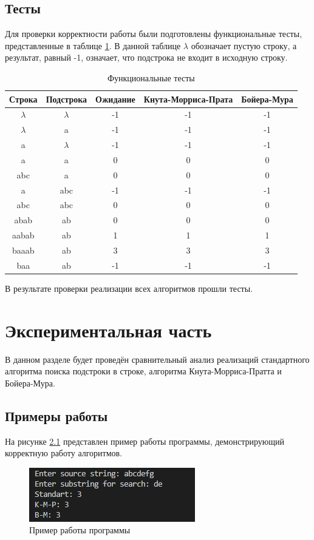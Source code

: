 \documentclass[12pt, a4paper]{report}
\begin{document}
	\section{Тесты}
	Для проверки корректности работы были подготовлены функциональные тесты, представленные в таблице \ref{unit-tests}. В данной таблице $\lambda$ обозначает пустую строку, а результат, равный -1, означает, что подстрока не входит в исходную строку.
	
	\begin{table}[ht!]
		\caption{Функциональные тесты}
		\label{unit-tests}
		\begin{center}
			\begin{tabular}{|c|c||c||c|c|}
			\hline
			\bf{Строка} & \bf{Подстрока} & \bf{Ожидание} & \bf{Кнута-Морриса-Прата} & \bf{Бойера-Мура}\\\hline
			$\lambda$ & $\lambda$ & -1 & -1 & -1 \\\hline
			$\lambda$ & a & -1 & -1 & -1 \\\hline
			a & $\lambda$ & -1 & -1 & -1 \\\hline
			a & a & 0 & 0 & 0 \\\hline
			abc & a & 0 & 0 & 0 \\\hline
			a & abc & -1 & -1 & -1 \\\hline
			abc & abc & 0 & 0 & 0 \\\hline
			abab & ab & 0 & 0 & 0 \\\hline
			aabab & ab & 1 & 1 & 1 \\\hline
			baaab & ab & 3 & 3 & 3 \\\hline
			baa & ab & -1 & -1 & -1 \\\hline
			\end{tabular}
		\end{center}
	\end{table}

	В результате проверки реализации всех алгоритмов прошли тесты.

	\chapter{Экспериментальная часть}
	В данном разделе будет проведён сравнительный анализ реализаций стандартного алгоритма поиска подстроки в строке, алгоритма Кнута-Морриса-Пратта и Бойера-Мура.
	\section{Примеры работы}
	На рисунке \ref{pic:example} представлен пример работы программы, демонстрирующий корректную работу алгоритмов.
	\begin{figure}[ht!]
		\centering
		\includegraphics[scale=1]{img/example.jpg}
		\caption{Пример работы программы}
		\label{pic:example}
	\end{figure}
	
\end{document}
